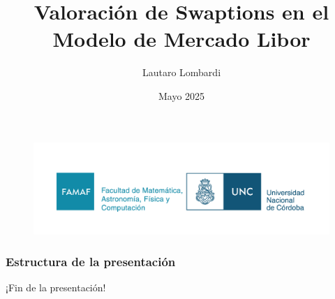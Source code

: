 \documentclass[
    11pt,               %
]{beamer}
\title[Swaptions en LMM]{Valoración de Swaptions en el Modelo de Mercado Libor}          %
\author[Lautaro Lombardi]{Lautaro Lombardi}        %
\institute[FAMAF]{Facultad de Matemática, Astronomía, Física y Computación \\ (FAMAF - UNC) }
\date[2025]{Mayo 2025}                                %
\begin{document}
\newtheorem{defin}{Definición}[section]
\newtheorem{thm}{Teorema}[section]
\newtheorem{prop}{Proposicion}[section]
\newtheorem{obs}{Observación}[section]
\newtheorem{notat}{Notación}[section]

\begin{frame}
    \begin{figure}
        \includegraphics[width=0.50\linewidth]{img/famaf.png} %
    \end{figure}
    \titlepage
\end{frame}

\begin{frame}
    \frametitle{Estructura de la presentación}
    \tableofcontents
\end{frame}



\begin{frame}
    \begin{center}
        {\Huge ¡Fin de la presentación!}
    \end{center}
\end{frame}
\end{document}
